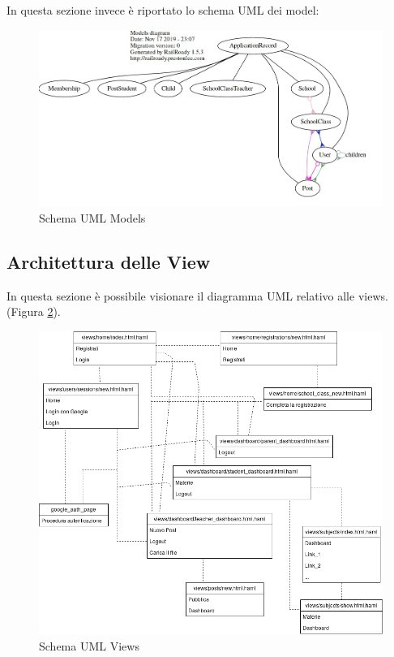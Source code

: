 \documentclass[Lau, binding=0.6cm, oneside]{sapthesis}
\begin{document}
In questa sezione invece è riportato lo schema UML dei model:\\

\begin{figure}[H]
	\centering
	\includegraphics[width=1\linewidth]{images/models_UML} 
	\caption{Schema UML Models}
	\label{fig:schema_UML_models}
\end{figure}

\subsection{Architettura delle View}

In questa sezione è possibile visionare il diagramma UML relativo alle views. (Figura \ref{fig:UML_views}).

\begin{figure}[H]
	\centering
	\includegraphics[width=1\linewidth]{images/UML_views} 
	\caption{Schema UML Views}
	\label{fig:UML_views}
\end{figure}
\end{document}
